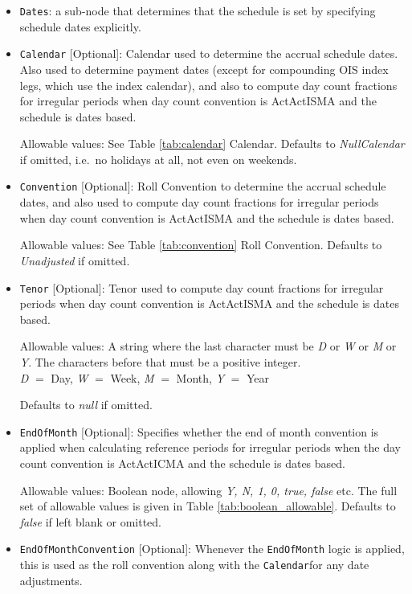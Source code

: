 \begin{itemize}

\item \lstinline!Dates!: a sub-node that determines that the schedule is set by specifying schedule dates explicitly. 

\item \lstinline!Calendar! [Optional]: Calendar used to determine the accrual schedule dates. Also used to determine payment dates (except for compounding OIS index legs, which use the index calendar), and also to compute day count fractions for irregular periods when day count convention is ActActISMA and the schedule is dates based. 

Allowable values: See Table \ref{tab:calendar} Calendar. Defaults to \emph{NullCalendar} if omitted, i.e.\ no holidays at all, not even on weekends.

\item \lstinline!Convention! [Optional]: Roll Convention to determine the accrual schedule dates, and also used to compute day count fractions for irregular periods when day count convention is ActActISMA and the schedule is dates based.

Allowable values: See Table
\ref{tab:convention} Roll Convention. Defaults to \emph{Unadjusted} if omitted.

\item \lstinline!Tenor! [Optional]: Tenor used to compute day count fractions for irregular periods when day count convention is ActActISMA and the schedule is dates based.

Allowable values: A string where the last character must be \emph{D} or \emph{W} or
\emph{M} or \emph{Y}.  The characters before that must be a positive integer. \\ \emph{D}
$=$ Day, \emph{W} $=$ Week, \emph{M} $=$ Month, \emph{Y} $=$ Year

Defaults to \emph{null} if omitted.

\item \lstinline!EndOfMonth! [Optional]: Specifies whether the end of month convention is applied when calculating reference periods
  for irregular periods when the day count convention is ActActICMA and the schedule is dates based.

Allowable values: Boolean node, allowing \emph{Y, N, 1, 0, true, false} etc. The full set of allowable values is given in Table \ref{tab:boolean_allowable}. Defaults to \emph{false} if left blank or omitted.

\item \lstinline!EndOfMonthConvention! [Optional]: Whenever the \lstinline!EndOfMonth! logic is applied, this is used as the roll convention along with the \lstinline!Calendar!for any date adjustments.


\end{itemize}
